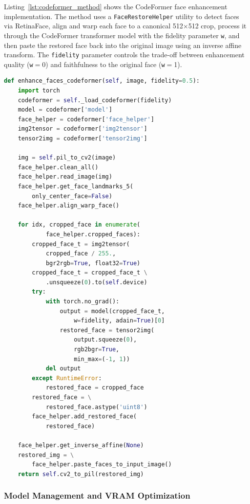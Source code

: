 \documentclass[12pt,a4paper]{report}
\begin{document}
Listing~\ref{lst:codeformer_method} shows the CodeFormer face enhancement implementation. The method uses a \texttt{FaceRestoreHelper} utility to detect faces via RetinaFace, align and warp each face to a canonical 512$\times$512 crop, process it through the CodeFormer transformer model with the fidelity parameter \texttt{w}, and then paste the restored face back into the original image using an inverse affine transform. The \texttt{fidelity} parameter controls the trade-off between enhancement quality (\texttt{w}$=$0) and faithfulness to the original face (\texttt{w}$=$1).

\begin{lstlisting}[language=Python, caption={CodeFormer face enhancement (\texttt{restoration.py})}, label={lst:codeformer_method}]
def enhance_faces_codeformer(self, image, fidelity=0.5):
    import torch
    codeformer = self._load_codeformer(fidelity)
    model = codeformer['model']
    face_helper = codeformer['face_helper']
    img2tensor = codeformer['img2tensor']
    tensor2img = codeformer['tensor2img']

    img = self.pil_to_cv2(image)
    face_helper.clean_all()
    face_helper.read_image(img)
    face_helper.get_face_landmarks_5(
        only_center_face=False)
    face_helper.align_warp_face()

    for idx, cropped_face in enumerate(
            face_helper.cropped_faces):
        cropped_face_t = img2tensor(
            cropped_face / 255.,
            bgr2rgb=True, float32=True)
        cropped_face_t = cropped_face_t \
            .unsqueeze(0).to(self.device)
        try:
            with torch.no_grad():
                output = model(cropped_face_t,
                    w=fidelity, adain=True)[0]
                restored_face = tensor2img(
                    output.squeeze(0),
                    rgb2bgr=True,
                    min_max=(-1, 1))
            del output
        except RuntimeError:
            restored_face = cropped_face
        restored_face = \
            restored_face.astype('uint8')
        face_helper.add_restored_face(
            restored_face)

    face_helper.get_inverse_affine(None)
    restored_img = \
        face_helper.paste_faces_to_input_image()
    return self.cv2_to_pil(restored_img)
\end{lstlisting}

\subsubsection{Model Management and VRAM Optimization}
\label{sec:vram_optimization}
\end{document}
